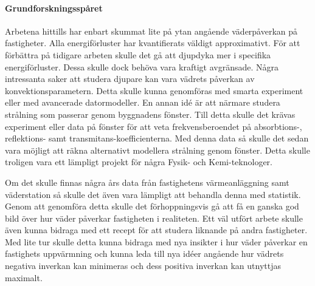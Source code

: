 \paragraph{Grundforskningsspåret}
Arbetena hittills har enbart skummat lite på ytan angående väderpåverkan på fastigheter. Alla energiförluster
har kvantifierats väldigt approximativt. För att förbättra på tidigare arbeten skulle det gå att djupdyka mer
i specifika energiförluster. Dessa skulle dock behöva vara kraftigt avgränsade. Några intressanta saker att studera
djupare kan vara vädrets påverkan av konvektionsparametern. Detta skulle kunna genomföras med smarta experiment eller
med avancerade datormodeller. En annan idé är att närmare studera strålning som passerar genom byggnadens fönster. Till detta
skulle det krävas experiment eller data på fönster för att veta frekvensberoendet på absorbtions-, reflektions- samt
transmitans-koefficienterna. Med
denna data så skulle det sedan vara möjligt att räkna alternativt modellera strålning genom fönster. Detta skulle troligen
vara ett lämpligt projekt för några Fysik- och Kemi-teknologer.

Om det skulle finnas några års data från fastighetens värmeanläggning samt väderstation så skulle det
även vara lämpligt att behandla denna med statistik. Genom att genomföra detta skulle det förhoppningsvis
gå att få en ganska god bild över hur väder påverkar fastigheten i realiteten. Ett väl utfört arbete skulle
även kunna bidraga med ett recept för att studera liknande på andra fastigheter. Med lite tur skulle detta
kunna bidraga med nya insikter i hur väder påverkar en fastighets uppvärmning och kunna leda till nya idéer angående
hur vädrets negativa inverkan kan minimeras och dess positiva inverkan kan utnyttjas maximalt.


